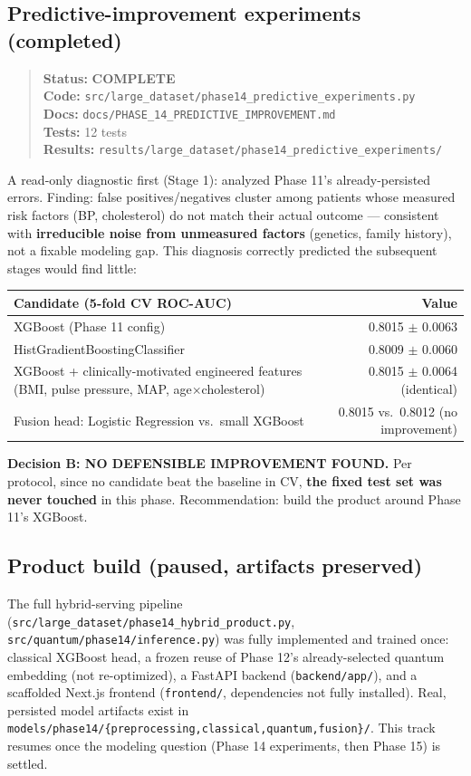\documentclass[11pt,a4paper]{article}
\newcommand{\code}[1]{\texttt{\small #1}}
\newcommand{\done}{\textcolor{donecolor}{\textbf{COMPLETE}}}
\newcommand{\phasestatus}[5]{%
\begin{quote}\small\raggedright
\textbf{Status:} #1 \\
\textbf{Code:} #2 \\
\textbf{Docs:} #3 \\
\textbf{Tests:} #4 \\
\textbf{Results:} #5
\end{quote}}
\begin{document}
\subsection{Predictive-improvement experiments (completed)}
\phasestatus{\done}{\code{src/large\_dataset/phase14\_predictive\_experiments.py}}{\code{docs/PHASE\_14\_PREDICTIVE\_IMPROVEMENT.md}}{12 tests}{\code{results/large\_dataset/phase14\_predictive\_experiments/}}

A read-only diagnostic first (Stage 1): analyzed Phase 11's already-persisted errors. Finding: false positives/negatives cluster among patients whose measured risk factors (BP, cholesterol) do not match their actual outcome --- consistent with \textbf{irreducible noise from unmeasured factors} (genetics, family history), not a fixable modeling gap. This diagnosis correctly predicted the subsequent stages would find little:

\begin{center}
\small
\begin{tabular}{@{}lr@{}}
\toprule
\textbf{Candidate (5-fold CV ROC-AUC)} & \textbf{Value} \\
\midrule
XGBoost (Phase 11 config) & 0.8015 $\pm$ 0.0063 \\
HistGradientBoostingClassifier & 0.8009 $\pm$ 0.0060 \\
XGBoost + clinically-motivated engineered features (BMI, pulse pressure, MAP, age$\times$cholesterol) & 0.8015 $\pm$ 0.0064 (identical) \\
Fusion head: Logistic Regression vs.\ small XGBoost & 0.8015 vs.\ 0.8012 (no improvement) \\
\bottomrule
\end{tabular}
\end{center}

\textbf{Decision B: NO DEFENSIBLE IMPROVEMENT FOUND.} Per protocol, since no candidate beat the baseline in CV, \textbf{the fixed test set was never touched} in this phase. Recommendation: build the product around Phase 11's XGBoost.

\subsection{Product build (paused, artifacts preserved)}
The full hybrid-serving pipeline (\code{src/large\_dataset/phase14\_hybrid\_product.py}, \code{src/quantum/phase14/inference.py}) was fully implemented and trained once: classical XGBoost head, a frozen reuse of Phase 12's already-selected quantum embedding (not re-optimized), a FastAPI backend (\code{backend/app/}), and a scaffolded Next.js frontend (\code{frontend/}, dependencies not fully installed). Real, persisted model artifacts exist in \code{models/phase14/\{preprocessing,classical,quantum,fusion\}/}. This track resumes once the modeling question (Phase 14 experiments, then Phase 15) is settled.
\end{document}
